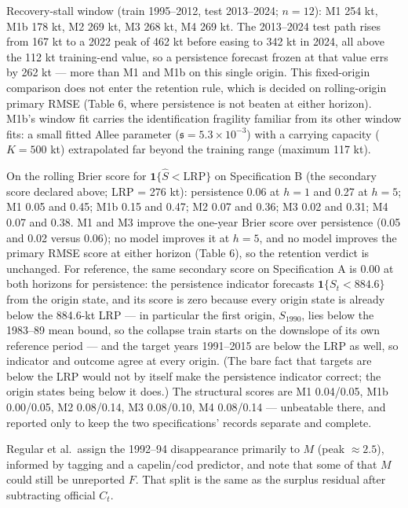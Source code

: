 \documentclass[11pt]{article}
\begin{document}
Recovery-stall window (train 1995--2012, test 2013--2024; \(n=12\)): M1
254 kt, M1b 178 kt, M2 269 kt, M3 268 kt, M4 269 kt. The 2013--2024 test
path rises from 167 kt to a 2022 peak of 462 kt before easing to 342 kt
in 2024, all above the 112 kt training-end value,
so a persistence forecast frozen at that value errs by 262 kt --- more
than M1 and M1b on this single origin. This fixed-origin comparison does
not enter the retention rule, which is decided on rolling-origin primary
RMSE (Table 6, where persistence is not beaten at either horizon). M1b's
window fit carries the identification fragility familiar from its other
window fits: a small fitted Allee parameter
(\(\mathfrak s = 5.3\times10^{-3}\)) with a carrying capacity (\(K=500\)
kt) extrapolated far beyond the training range (maximum 117 kt).

On the rolling Brier score for \(\mathbf{1}\{\hat S<\mathrm{LRP}\}\) on
Specification B (the secondary score declared above; LRP = 276 kt):
persistence 0.06 at \(h{=}1\) and 0.27 at \(h{=}5\); M1 0.05 and 0.45;
M1b 0.15 and 0.47; M2 0.07 and 0.36; M3 0.02 and 0.31; M4 0.07 and 0.38.
M1 and M3 improve the one-year Brier score over persistence (0.05 and
0.02 versus 0.06); no model improves it at \(h{=}5\), and no model
improves the primary RMSE score at either horizon (Table 6), so the
retention verdict is unchanged. For reference, the same secondary score
on Specification A is 0.00 at both horizons for persistence: the
persistence indicator forecasts \(\mathbf{1}\{S_t<884.6\}\) from the
origin state, and its score is zero because every origin state is
already below the 884.6-kt LRP --- in particular the first origin,
\(S_{1990}\), lies below the 1983--89 mean bound, so the collapse train
starts on the downslope of its own reference period --- and the target
years 1991--2015 are below the LRP as well, so indicator and outcome
agree at every origin. (The bare fact that targets are below the LRP
would not by itself make the persistence indicator correct; the origin
states being below it does.) The structural scores are M1 0.04/0.05, M1b
0.00/0.05, M2 0.08/0.14, M3 0.08/0.10, M4 0.08/0.14 --- unbeatable
there, and reported only to keep the two specifications' records
separate and complete.

Regular et al.~assign the 1992--94 disappearance primarily to \(M\)
(peak \(\approx 2.5\)), informed by tagging and a capelin/cod predictor,
and note that some of that \(M\) could still be unreported \(F\). That
split is the same as the surplus residual after subtracting official
\(C_t\).
\end{document}
